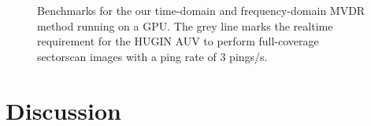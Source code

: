 {%

\begin{figure}[!h]\centering%
%
\caption{Benchmarks for the our time-domain and frequency-domain MVDR method running on a GPU. The grey line marks the realtime requirement for the HUGIN AUV to perform full-coverage sectorscan images with a ping rate of 3 pings/s.}\label{2_fig_benchmark}
\end{figure}


\newpage
\section{Discussion}



}
